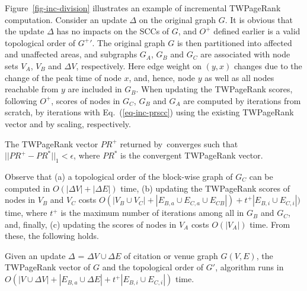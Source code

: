 \begin{example} \label{eg-layer-dag}
Figure~\ref{fig-inc-division} illustrates an example of incremental TWPageRank computation. Consider an update $\Delta$ on the original graph $G$.
%
It is obvious that the update $\Delta$ has no impacts on the SCCs of $G$, and $O^+$ defined earlier is a valid topological order of $G^+{'}$.
%
The original graph $G$ is then partitioned into affected and unaffected areas, and subgraphs $G_A$, $G_B$ and $G_C$ are associated with node sets $V_A$, $V_B$ and $\Delta V$, respectively. Here edge weight on $(y, x)$ changes due to the change of the peak time of node $x$, and, hence, node $y$ as well as all nodes reachable from $y$ are included in $G_B$.
%
When updating the TWPageRank scores, following $O^+$, scores of nodes in $G_C$, $G_B$ and $G_A$ are computed by iterations from scratch, by iterations with Eq.~(\ref{eq-inc-prscc}) using the existing TWPageRank vector and by scaling, respectively.
\end{example}

\vspace{-1ex}
\begin{theorem}
\label{lemma-subgraphA}
The TWPageRank vector $PR^+$ returned by~\inctwprscc converges such that $||PR^+-PR^{*}||_1 < \epsilon$, where $PR^{*}$ is the convergent TWPageRank vector.
\end{theorem}




Observe that (a) a topological order of the block-wise graph of $G_C$ can be computed in $O(|\Delta V|+|\Delta E|)$ time,
(b) updating the TWPageRank scores of nodes in $V_B$ and $V_C$ costs $O(|V_B\cup V_C|+|E_{B,a}\cup E_{C,a}\cup E_{CB}|)+t^+|E_{B,i}\cup E_{C,i}|)$ time, where $t^+$ is  the maximum number of iterations among all \sccs in $G_B$ and $G_C$, and, finally, (c) updating the scores of nodes in $V_A$ costs $O(|V_A|)$ time. From these, the following holds.


\begin{prop} \label{lemma-inc-citation-comp}
Given an update $\Delta$ = $\Delta V\cup\Delta E$ of citation or venue graph $G(V,E)$, the TWPageRank vector of $G$ and the topological order of $G'$, algorithm \inctwprscc runs in $O(|V\cup \Delta V| + |E_{B,a}\cup \Delta E| + t^+|E_{B,i}\cup E_{C,i}|)$ time.
\end{prop}



